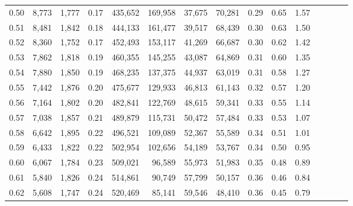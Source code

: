 \begin{tabular}{rrrcrrrrrrrrrrr}
0.50 &   8,773 &  1,777 &                                       0.17 &  435,652 &  169,958 &   37,675 &   70,281 &  0.29 &  0.65 &                         1.57 \\
0.51 &   8,481 &  1,842 &                                       0.18 &  444,133 &  161,477 &   39,517 &   68,439 &  0.30 &  0.63 &                         1.50 \\
0.52 &   8,360 &  1,752 &                                       0.17 &  452,493 &  153,117 &   41,269 &   66,687 &  0.30 &  0.62 &                         1.42 \\
0.53 &   7,862 &  1,818 &                                       0.19 &  460,355 &  145,255 &   43,087 &   64,869 &  0.31 &  0.60 &                         1.35 \\
0.54 &   7,880 &  1,850 &                                       0.19 &  468,235 &  137,375 &   44,937 &   63,019 &  0.31 &  0.58 &                         1.27 \\
0.55 &   7,442 &  1,876 &                                       0.20 &  475,677 &  129,933 &   46,813 &   61,143 &  0.32 &  0.57 &                         1.20 \\
0.56 &   7,164 &  1,802 &                                       0.20 &  482,841 &  122,769 &   48,615 &   59,341 &  0.33 &  0.55 &                         1.14 \\
0.57 &   7,038 &  1,857 &                                       0.21 &  489,879 &  115,731 &   50,472 &   57,484 &  0.33 &  0.53 &                         1.07 \\
0.58 &   6,642 &  1,895 &                                       0.22 &  496,521 &  109,089 &   52,367 &   55,589 &  0.34 &  0.51 &                         1.01 \\
0.59 &   6,433 &  1,822 &                                       0.22 &  502,954 &  102,656 &   54,189 &   53,767 &  0.34 &  0.50 &                         0.95 \\
0.60 &   6,067 &  1,784 &                                       0.23 &  509,021 &   96,589 &   55,973 &   51,983 &  0.35 &  0.48 &                         0.89 \\
0.61 &   5,840 &  1,826 &                                       0.24 &  514,861 &   90,749 &   57,799 &   50,157 &  0.36 &  0.46 &                         0.84 \\
0.62 &   5,608 &  1,747 &                                       0.24 &  520,469 &   85,141 &   59,546 &   48,410 &  0.36 &  0.45 &                         0.79 \\

\end{tabular}
